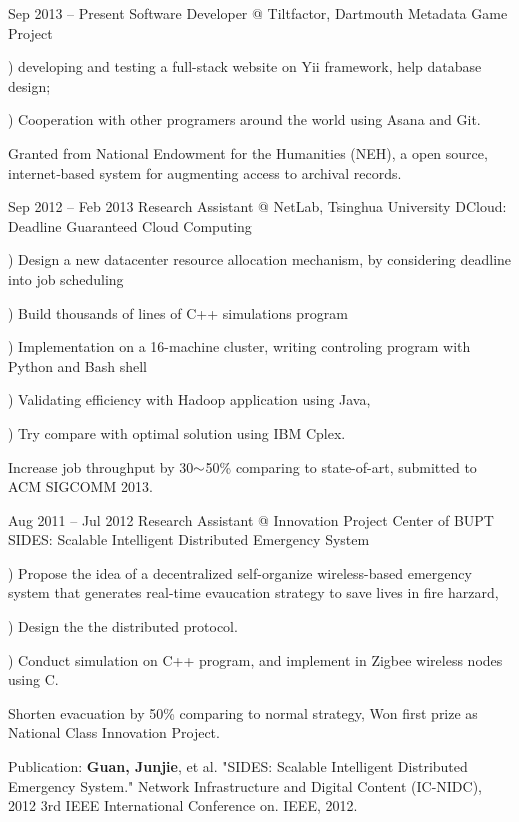 \documentclass{tccv}
\begin{document}
\begin{eventlist}

\item{Sep 2013 -- Present}
     {Software Developer @ Tiltfactor, Dartmouth}
     {Metadata Game Project}
     
     ) developing and testing a full-stack website on Yii framework, help database design;
     
     ) Cooperation with other programers around the world using Asana and Git.
     
     Granted from National Endowment for the Humanities (NEH), a open source, internet‐based system for augmenting access to archival records.
     
     
\item{Sep 2012 -- Feb 2013}
     {Research Assistant @ NetLab, Tsinghua University}
     {DCloud: Deadline Guaranteed Cloud Computing}
     
     ) Design a new datacenter resource allocation mechanism, by considering deadline into job scheduling
     
     ) Build thousands of lines of C++ simulations program
     
     ) Implementation on a 16-machine cluster, writing controling  program with Python and Bash shell
     
     ) Validating efficiency with Hadoop application using Java, 
     
     ) Try compare with optimal solution using IBM Cplex.

     Increase job throughput by 30$\scriptsize{\sim}$50\% comparing to state-of-art, submitted to ACM SIGCOMM 2013.
     
\item{Aug 2011 -- Jul 2012}
     {Research Assistant @ Innovation Project Center of BUPT}
     {SIDES: Scalable Intelligent Distributed Emergency System}
     
     ) Propose the idea of a decentralized self-organize wireless-based emergency system that generates real-time evaucation strategy to save lives in fire harzard, 
     
     ) Design the the distributed protocol.
     
     ) Conduct simulation on C++ program, and implement in Zigbee wireless nodes using C.
     
Shorten evacuation by 50\% comparing to normal strategy, Won first prize as National Class Innovation Project.

Publication: \textbf{Guan, Junjie}, et al. "SIDES: Scalable Intelligent Distributed Emergency System." Network Infrastructure and Digital Content (IC-NIDC), 2012 3rd IEEE International Conference on. IEEE, 2012.     
     
\end{eventlist}
\end{document}
